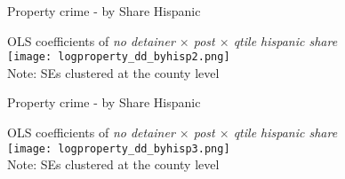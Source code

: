 \documentclass[xcolor=pdftex,dvipsnames,table]{beamer}
\begin{document}
\begin{frame}{Property crime - by Share Hispanic}
\footnotesize
\begin{center}
OLS coefficients of \textit{no detainer $\times$ post $\times$ qtile hispanic share}\\
\texttt{[image: logproperty\_dd\_byhisp2.png]}\\
\footnotesize{Note: SEs clustered at the county level}
\end{center}
\end{frame}

\begin{frame}{Property crime - by Share Hispanic}
\footnotesize
\begin{center}
OLS coefficients of \textit{no detainer $\times$ post $\times$ qtile hispanic share}\\
\texttt{[image: logproperty\_dd\_byhisp3.png]}\\
\footnotesize{Note: SEs clustered at the county level}
\end{center}
\end{frame}


\end{document}
